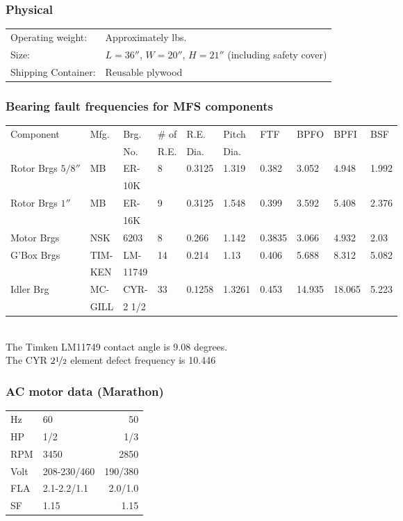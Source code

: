 \documentclass[a4paper,11pt]{report}
\begin{document}
\subsubsection{Physical}
\begin{tabular}{ll}
Operating weight: &  Approximately \unit[130]{lbs.}\\
Size: &  $L = 36''$, $W = 20''$, $H = 21''$ (including safety cover)\\
Shipping Container: &  Reusable plywood 
\end{tabular}

\subsubsection{Bearing fault frequencies for MFS components}

\begin{tabular}{|l|l|l|l|l|l|l|l|l|l|}
\hline
Component      & Mfg.& Brg.& \# of & R.E.& Pitch & FTF & BPFO & BPFI & BSF \\
               &     & No. & R.E.& Dia.&  Dia. &     &      &      &      \\
\hline
Rotor Brgs $5/8''$ & MB  & ER-& 8 & 0.3125& 1.319& 0.382& 3.052&4.948&1.992\\ 
 &  & 10K&  & & & & & &  \\ 
Rotor Brgs $1''$ &MB &ER- &9 &0.3125 &1.548 &0.399 &3.592& 5.408& 2.376 \\ 
 & &16K & & & & & & & \\ 
Motor Brgs &NSK & 6203 &8 &0.266 &1.142 &0.3835 &3.066& 4.932& 2.03 \\
G'Box Brgs &TIM-&LM- &14 &0.214 &1.13 &0.406& 5.688& 8.312& 5.082 \\
	 &KEN & 11749 &  &  &  & & & & \\
Idler Brg &MC-& CYR-& 33 &0.1258& 1.3261& 0.453& 14.935& 18.065& 5.223 \\
          &GILL & 2 1/2 &  &  &  &  &  & &  \\
\hline
\end{tabular}\\

The Timken LM11749 contact angle is 9.08 degrees.\\
The CYR $2\nicefrac{1}{2}$ element defect frequency is 10.446

\subsubsection{AC motor data (Marathon)} \label{motorspec}
\begin{tabular}{llr}
Hz & 60 & 50 \\
HP & 1/2 & 1/3 \\
RPM  & 3450  & 2850   \\
Volt & 208-230/460 & 190/380 \\
FLA & 2.1-2.2/1.1 & 2.0/1.0 \\
SF & 1.15 & 1.15 
\end{tabular}\\
\end{document}
